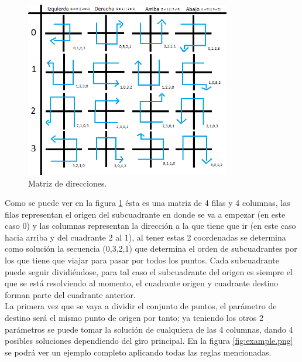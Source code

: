      \begin{figure}[hbtp]
        \centering
            \includegraphics[width=0.8\textwidth]{MetodoRectanguloAureo/Imagenes/automatchart.png}
            \caption{Matriz de direcciones.}
            \label{fig:automatchart.png}
    \end{figure}
    
\hspace*{1cm} Como se puede ver en la figura \ref {fig:automatchart.png} ésta es una matriz de 4 filas y 4 columnas, las filas representan el origen del subcuadrante en donde se va a empezar  (en este caso 0) y las columnas representan la dirección a la que tiene que ir (en este caso hacia arriba y del cuadrante 2 al 1), al tener estas 2 coordenadas se determina como solución la secuencia (0,3,2,1) que determina el orden de subcuadrantes por los que tiene que viajar para pasar por todos los puntos. Cada subcuadrante puede seguir dividiéndose, para tal caso el subcuadrante del origen es siempre el que se está resolviendo al momento, el cuadrante origen y cuadrante destino forman parte del cuadrante anterior.\\
\hspace*{1cm} La primera vez que se vaya a dividir el conjunto de puntos, el parámetro de destino será el mismo punto de origen por tanto; ya teniendo los otros 2 parámetros se puede tomar la solución de cualquiera de las 4 columnas, dando 4 posibles soluciones dependiendo del giro principal. En la figura \ref {fig:example.png} se podrá ver un ejemplo completo aplicando todas las reglas mencionadas.\\

